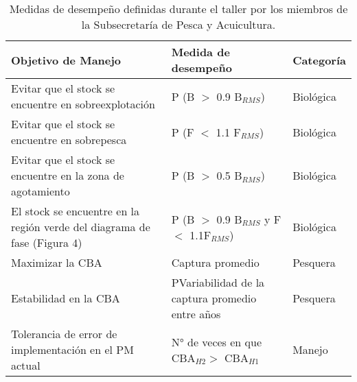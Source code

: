 \begin{table}[h]
    \centering
    \caption{Medidas de desempeño definidas durante el taller por los miembros de la Subsecretaría de Pesca y Acuicultura.}
    \label{tab:tabla4}
    \begin{tabular}{|p{5.5cm}|p{6cm}|p{2cm}|}
        \hline
        \textbf{Objetivo de Manejo} & \textbf{Medida de desempeño} & \textbf{Categoría}  \\
        \hline
        Evitar que el stock se encuentre en sobreexplotación & P (B $>$ 0.9 B$_{RMS}$) & Biológica\\
        \hline
        Evitar que el stock se encuentre en sobrepesca & P (F $<$ 1.1 F$_{RMS}$) & Biológica \\
        \hline
        Evitar que el stock se encuentre en la zona de agotamiento  & P (B $>$ 0.5 B$_{RMS}$) & Biológica \\
        \hline
        El stock se encuentre en la región verde del diagrama de fase (Figura 4) & P (B $>$ 0.9 B$_{RMS}$ y F $<$ 1.1F$_{RMS}$) & Biológica \\
        \hline
        Maximizar la CBA & Captura promedio & Pesquera \\
        \hline
        Estabilidad en la CBA & PVariabilidad de la captura promedio entre años & Pesquera\\
        \hline
        Tolerancia de error de implementación en el PM actual & N° de veces en que CBA$_{H2} >$ CBA$_{H1}$ & Manejo \\
        \hline
    \end{tabular}
\end{table}

